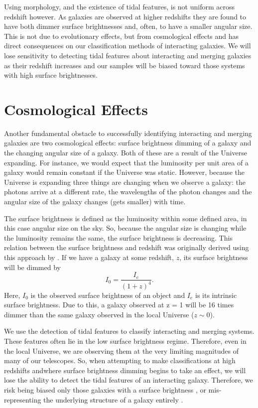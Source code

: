 Using morphology, and the existence of tidal features, is not uniform across redshift however. As galaxies are observed at higher redshifts they are found to have both dimmer surface brightnesses and, often, to have a smaller angular size. This is not due to evolutionary effects, but from cosmological effects and has direct consequences on our classification methods of interacting galaxies. We will lose sensitivity to detecting tidal features about interacting and merging galaxies as their redshift increases and our samples will be biased toward those systems with high surface brightnesses.

\section{Cosmological Effects}
\noindent Another fundamental obstacle to successfully identifying interacting and merging galaxies are two cosmological effects: surface brightness dimming of a galaxy and the changing angular size of a galaxy. Both of these are a result of the Universe expanding. For instance, we would expect that the luminosity per unit area of a galaxy would remain constant if the Universe was static. However, because the Universe is expanding three things are changing when we observe a galaxy: the photons arrive at a different rate, the wavelengths of the photon changes and the angular size of the galaxy changes (gets smaller) with time.

The surface brightness is defined as the luminosity within some defined area, in this case angular size on the sky. So, because the angular size is changing while the luminosity remains the same, the surface brightness is decreasing. This relation between the surface brightness and redshift was originally derived using this approach by \citet{1930PNAS...16..511T, 1934rtc..book.....T}. If we have a galaxy at some redshift, $z$, its surface brightness will be dimmed by
\begin{equation}\label{surf_dimming}
I_{0} = \frac{I_{e}}{(1+z)^{4}}.
\end{equation}
Here, $I_{0}$ is the observed surface brightness of an object and $I_{e}$ is its intrinsic surface brightness. Due to this, a galaxy observed at z = 1 will be 16 times dimmer than the same galaxy observed in the local Universe ($z\sim0$). 

We use the detection of tidal features to classify interacting and merging systems. These features often lie in the low surface brightness regime. Therefore, even in the local Universe, we are observing them at the very limiting magnitudes of many of our telescopes. So, when attempting to make classifications at high redshifts andwhere surface brightness dimming begins to take an effect, we will lose the ability to detect the tidal features of an interacting galaxy. Therefore, we risk being biased only those galaxies with a surface brightness \citep{2014ApJ...796..102C}, or mis-representing the underlying structure of a galaxy entirely \citep{2018MNRAS.473.2701D}.

